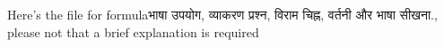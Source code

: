 Here's the file for formulaभाषा उपयोग, व्याकरण प्रश्न, विराम चिह्न, वर्तनी और भाषा सीखना., please not that a brief explanation is required